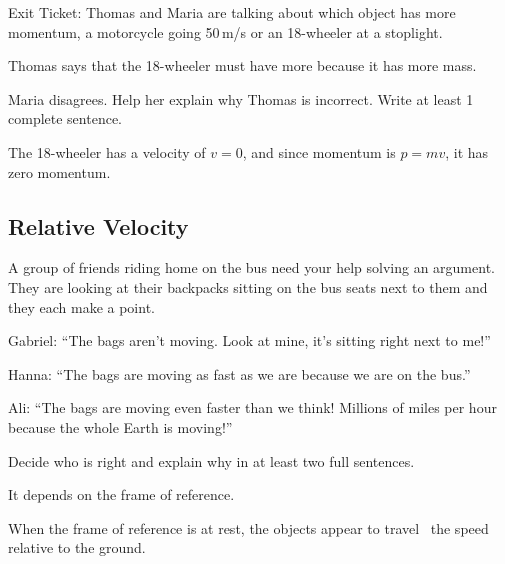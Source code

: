 \documentclass[]{exam}
\begin{document}
\begin{questions}
 
\question %
Exit Ticket: Thomas and Maria are talking about which object has more momentum, a motorcycle going 50\,m/s or an 18-wheeler at a stoplight. 

Thomas says that the 18-wheeler must have more because it has more mass. 

Maria disagrees. Help her explain why Thomas is incorrect. Write at least 1 complete sentence.

\begin{solution}
    The 18-wheeler has a velocity of $v = 0$, and since momentum is $p = mv$, it has zero momentum. 
\end{solution}

\clearpage
\begin{EnvUplevel}
    \subsection{Relative Velocity}
\end{EnvUplevel}

\question
A group of friends riding home on the bus need your help solving an argument. They are looking at their backpacks sitting on the bus seats next to them and they each make a point. 

Gabriel: ``The bags aren't moving. Look at mine, it’s sitting right next to me!''

Hanna: ``The bags are moving as fast as we are because we are on the bus.''

Ali: ``The bags are moving even faster than we think! Millions of miles per hour because the whole Earth is moving!''

Decide who is right and explain why in at least two full sentences.

\begin{solution}
    It depends on the frame of reference.
\end{solution}


\question
When the frame of reference is at rest, the objects appear to travel \fillin[equal to]\ the speed relative to the ground.


\end{questions}
\end{document}
